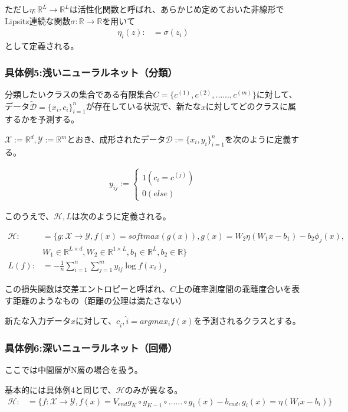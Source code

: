 \documentclass{jsarticle}
\begin{document}
ただし$\eta:\mathbb{R}^L\to\mathbb{R}^L$は活性化関数と呼ばれ、あらかじめ定めておいた非線形でLipsitz連続な関数$\sigma:\mathbb{R}\to\mathbb{R}$を用いて
\begin{align}
\eta_i(z):&=\sigma(z_i)
\end{align}
として定義される。



\subsubsection{具体例5:浅いニューラルネット（分類）}
分類したいクラスの集合である有限集合$C=\{c^{(1)},c^{(2)},......,c^{(m)}\}$に対して、データ$\tilde{\mathcal{D}}=\{x_i,c_i\}^n_{i=1}$が存在している状況で、新たな$x$に対してどのクラスに属するかを予測する。

$\mathcal{X}:=\mathbb{R}^d,\mathcal{Y}:=\mathbb{R}^m$とおき、成形されたデータ$\mathcal{D}:=\{x_i,y_i\}^n_{i=1}$を次のように定義する。

\begin{align}
y_{ij}:=\begin{cases}
    1(c_i=c^{(j)})\\
    0(else)
\end{cases}
\end{align}

このうえで、$\mathcal{H},L$は次のように定義される。


\begin{align*}
\mathcal{H}:&=\{g:\mathcal{X}\to\mathcal{Y},f(x)=softmax(g(x)),g(x)=W_2\eta(W_1x-b_1)-b_2\phi_j(x),\\ 
&W_1\in\mathbb{R}^{L\times d},W_2\in \mathbb{R}^{1\times L},b_1\in\mathbb{R}^L,b_2\in\mathbb{R}\}\\
L(f):&=-\frac{1}{n}\sum^n_{i=1}\sum^m_{j=1}y_{ij}\log{f(x_i)_j}
\end{align*}

この損失関数は交差エントロピーと呼ばれ、$C$上の確率測度間の乖離度合いを表す距離のようなもの（距離の公理は満たさない）

新たな入力データ$x$に対して、$c_{\hat{i}},\hat{i}=argmax_i f(x)$を予測されるクラスとする。


\subsubsection{具体例6:深いニューラルネット（回帰）}
ここでは中間層がN層の場合を扱う。

基本的には具体例4と同じで、$\mathcal{H}$のみが異なる。
\begin{align}
\mathcal{H}:&=\{f:\mathcal{X}\to\mathcal{Y},f(x)=V_{end}g_K\circ g_{K-1}\circ......\circ g_1(x)-b_{end},g_i(x)=\eta(W_ix-b_i)\}
\end{align}
\end{document}
